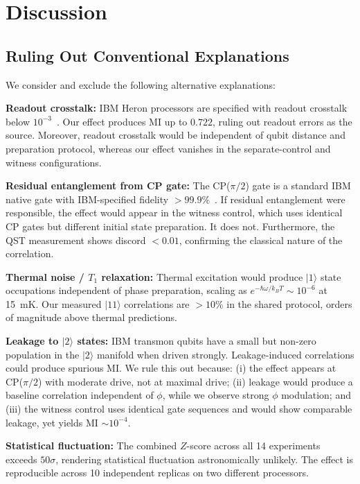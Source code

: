 ﻿\documentclass[12pt,a4paper]{article}
\begin{document}
\section{Discussion}
\label{sec:discussion}

\subsection{Ruling Out Conventional Explanations}

We consider and exclude the following alternative explanations:

\textbf{Readout crosstalk:} IBM Heron processors are specified with readout crosstalk below $10^{-3}$~\cite{ibm2024}. Our effect produces MI up to $0.722$, ruling out readout errors as the source. Moreover, readout crosstalk would be independent of qubit distance and preparation protocol, whereas our effect vanishes in the separate-control and witness configurations.

\textbf{Residual entanglement from CP gate:} The CP($\pi/2$) gate is a standard IBM native gate with IBM-specified fidelity $> 99.9\%$~\cite{ibm2024}. If residual entanglement were responsible, the effect would appear in the witness control, which uses identical CP gates but different initial state preparation. It does not. Furthermore, the QST measurement shows discord $< 0.01$, confirming the classical nature of the correlation.

\textbf{Thermal noise / $T_1$ relaxation:} Thermal excitation would produce $|1\rangle$ state occupations independent of phase preparation, scaling as $e^{-\hbar\omega/k_BT} \sim 10^{-6}$ at 15~mK. Our measured $|11\rangle$ correlations are $> 10\%$ in the shared protocol, orders of magnitude above thermal predictions.

\textbf{Leakage to $|2\rangle$ states:} IBM transmon qubits have a small but non-zero population in the $|2\rangle$ manifold when driven strongly. Leakage-induced correlations could produce spurious MI. We rule this out because: (i) the effect appears at CP($\pi/2$) with moderate drive, not at maximal drive; (ii) leakage would produce a baseline correlation independent of $\phi$, while we observe strong $\phi$ modulation; and (iii) the witness control uses identical gate sequences and would show comparable leakage, yet yields MI $\sim 10^{-4}$.

\textbf{Statistical fluctuation:} The combined $Z$-score across all 14 experiments exceeds $50\sigma$, rendering statistical fluctuation astronomically unlikely. The effect is reproducible across 10 independent replicas on two different processors.
\end{document}

